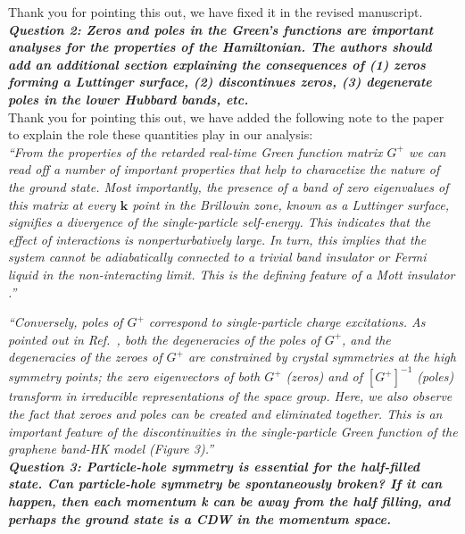\documentclass[aps,reprint,notitlepage,onecolumn,12pt]{revtex4-2}
\numberwithin{equation}{section}
\begin{document}
Thank you for pointing this out, we have fixed it in the revised manuscript.\\

\textbf{\textit{Question 2: Zeros and poles in the Green’s functions are important analyses for the properties of the Hamiltonian. The authors should add an
additional section explaining the consequences of (1) zeros forming a
Luttinger surface, (2) discontinues zeros, (3) degenerate poles in the
lower Hubbard bands, etc.}} \\

Thank you for pointing this out, we have added the following note to the paper to explain the role these quantities play in our analysis:\\

\indent \textit{ ``From the properties of the retarded real-time Green function matrix $G^{+}$ we can read off a number of important properties that help to characetize the nature of the ground state.
Most importantly, the presence of a band of \textit{zero} eigenvalues of this matrix at every $\mathbf{k}$ point in the Brillouin zone, known as a Luttinger surface, signifies a divergence of the single-particle self-energy.
This indicates that the effect of interactions is nonperturbatively large.  
In turn, this implies that the system cannot be adiabatically connected to a trivial band insulator or Fermi liquid in the non-interacting limit. 
This is the defining feature of a Mott insulator \cite{dave2013absence}.''}

\indent\textit{``Conversely, \textit{poles} of $G^{+}$ correspond to single-particle charge excitations. 
As pointed out in Ref.~\cite{setty2023symmetry}, both the degeneracies of the poles of $G^{+}$, and the degeneracies of the zeroes of $G^{+}$ are constrained by crystal symmetries at the high symmetry points; the zero eigenvectors of both $G^{+}$ (zeros) and of $[G^{+}]^{-1}$ (poles) transform in irreducible representations of the space group. 
Here, we also observe the fact that zeroes and poles can be created and eliminated together.
This is an important feature of the discontinuities in the single-particle Green function of the graphene band-HK model (Figure 3).''}\\

\textbf{\textit{Question 3: Particle-hole symmetry is essential for the half-filled state. Can particle-hole symmetry be spontaneously broken? If it can happen, then each momentum k can be away from the half filling, and perhaps the ground state is a CDW in the momentum space.}}\\
\end{document}
